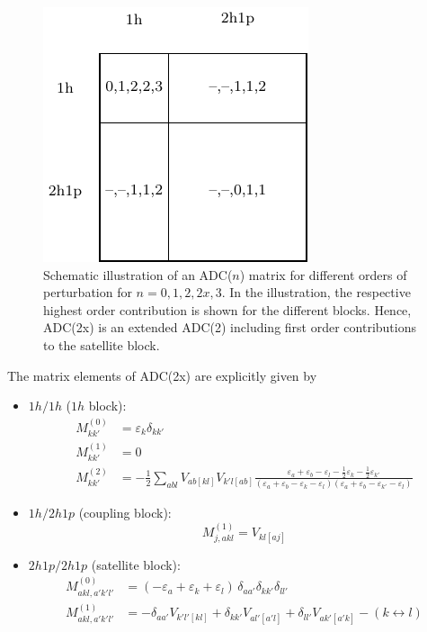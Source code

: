 \begin{figure}[h]
  \centering
  \includegraphics{pics/adcmat_pgf.pdf}
  \caption{Schematic illustration of an {ADC}($n$) matrix for different orders
           of perturbation for $n=0,1,2,2x,3$. In the illustration, the respective
           highest order contribution is shown for the different blocks.
           Hence, ADC(2x) is an extended ADC(2) including first
           order contributions to the satellite block.}
  \label{figure:adcmat_pgf}
\end{figure}

The matrix elements of ADC(2x) are explicitly given by
\begin{itemize}
 \item $1h/1h$ ($1h$ block):
   \begin{align}
    M_{kk'}^{(0)} &= \varepsilon_k \delta_{kk'} \\
    M_{kk'}^{(1)} &= 0 \\
    M_{kk'}^{(2)} &= -\frac12 \sum\limits_{abl} V_{ab[kl]} V_{k'l[ab]} %
                     \frac{\varepsilon_a+\varepsilon_b-\varepsilon_l
                       -\frac12 \varepsilon_k-\frac12 \varepsilon_{k'}}
                     {(\varepsilon_a+\varepsilon_b-\varepsilon_k-\varepsilon_l)
                      (\varepsilon_a+\varepsilon_b-\varepsilon_{k'}-\varepsilon_l)}
   \end{align}
 \item $1h/2h1p$ (coupling block):
   \begin{equation}
    M_{j,akl}^{(1)} = V_{kl[aj]}
   \end{equation}
 \item $2h1p/2h1p$ (satellite block):
   \begin{align}
    M_{akl,a'k'l'}^{(0)} &= (-\varepsilon_a+\varepsilon_k+\varepsilon_l)
                             \, \delta_{aa'}\delta_{kk'}\delta_{ll'} \\
    M_{akl,a'k'l'}^{(1)} &= -\delta_{aa'} V_{k'l'[kl]} + \delta_{kk'} V_{al'[a'l]}
                            +\delta_{ll'} V_{ak'[a'k]} - (k \leftrightarrow l)
   \end{align}
\end{itemize}


